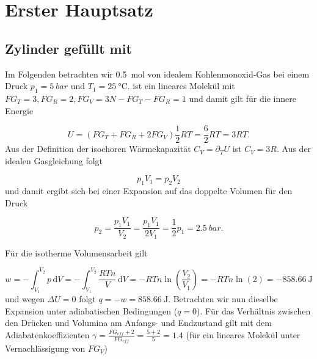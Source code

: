 \section{Erster Hauptsatz}

  \subsection{Zylinder gefüllt mit }
    
      Im Folgenden betrachten wir \SI[mode=text]{0.5}{\mole} von idealem Kohlenmonoxid-Gas bei einem Druck $p_1 = \SI[mode=text]{5}{bar}$ und $T_1 = \SI[mode=text]{25}{\degreeCelsius}$.  ist ein lineares Molekül mit $FG_T = 3, FG_R = 2, FG_V = 3N - FG_T - FG_R = 1$ und damit gilt für die innere Energie
    
        \begin{equation}
          U = (FG_T + FG_R + 2 FG_V)\frac{1}{2} RT = \frac{6}{2} RT = 3 RT.
        \end{equation}
      Aus der Definition der isochoren Wärmekapazität $C_V = \partial_T U$ ist $C_V = 3R$. Aus der idealen Gasgleichung folgt 
      
        \begin{equation}
          p_1 V_1 = p_2 V_2
        \end{equation}
      und damit ergibt sich bei einer Expansion auf das doppelte Volumen für den Druck
      
        \begin{equation}
          p_2 = \frac{p_1 V_1}{V_2} = \frac{p_1 V_1}{2 V_1} = \frac{1}{2} p_1 = \SI[mode=text]{2.5}{bar}.
        \end{equation}
      
      Für die isotherme Volumensarbeit gilt
      
        \begin{equation}
          w = - \int_{V_1}^{V_2} p \, \text{d} V = - \int_{V_1}^{V_2} \frac{RTn}{V} \, \text{d} V = - RTn \ln\left(\frac{V_2}{V_1}\right) = - RTn \ln(2) = \SI[mode=text]{-858.66}{\joule}
        \end{equation}
      und wegen $\Delta U = 0$ folgt $q = -w = \SI[mode=text]{+858.66}{\joule}$. Betrachten wir nun dieselbe Expansion unter adiabatischen Bedingungen ($q = 0$). Für das Verhältnis zwischen den Drücken und Volumina am Anfangs- und Endzustand gilt mit dem Adiabatenkoeffizienten $\gamma = \frac{FG_{eff} + 2}{FG_{eff}} = \frac{5 + 2}{5} = 1.4$ (für ein lineares Molekül unter Vernachlässigung von $FG_V$)
      
